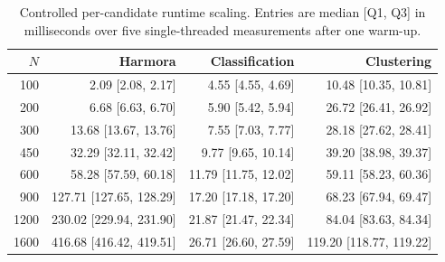 \begin{table}[t]
\centering
\caption{Controlled per-candidate runtime scaling. Entries are median [Q1, Q3] in milliseconds over five single-threaded measurements after one warm-up.}
\label{tab:runtime_sample_scaling}
\small
\setlength{\tabcolsep}{5pt}
\begin{tabular}{rrrr}
\toprule
$N$ & \textbf{Harmora} & \textbf{Classification} & \textbf{Clustering} \\
\midrule
100 & 2.09 [2.08, 2.17] & 4.55 [4.55, 4.69] & 10.48 [10.35, 10.81] \\
200 & 6.68 [6.63, 6.70] & 5.90 [5.42, 5.94] & 26.72 [26.41, 26.92] \\
300 & 13.68 [13.67, 13.76] & 7.55 [7.03, 7.77] & 28.18 [27.62, 28.41] \\
450 & 32.29 [32.11, 32.42] & 9.77 [9.65, 10.14] & 39.20 [38.98, 39.37] \\
600 & 58.28 [57.59, 60.18] & 11.79 [11.75, 12.02] & 59.11 [58.23, 60.36] \\
900 & 127.71 [127.65, 128.29] & 17.20 [17.18, 17.20] & 68.23 [67.94, 69.47] \\
1200 & 230.02 [229.94, 231.90] & 21.87 [21.47, 22.34] & 84.04 [83.63, 84.34] \\
1600 & 416.68 [416.42, 419.51] & 26.71 [26.60, 27.59] & 119.20 [118.77, 119.22] \\
\bottomrule
\end{tabular}
\end{table}
